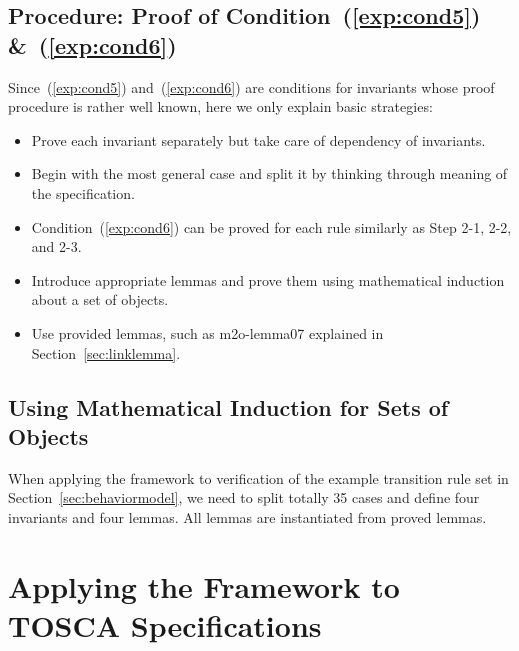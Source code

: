 \documentclass[12pt]{report}
\begin{document}
\section{Procedure: Proof of Condition~(\ref{exp:cond5}) \&~(\ref{exp:cond6})}
\label{sec:invariant}
Since~(\ref{exp:cond5}) and~(\ref{exp:cond6}) are conditions for invariants whose proof procedure
is rather well known, here we only explain basic strategies:
\begin{itemize}
\item Prove each invariant separately but take care of dependency
  of invariants.
\item Begin with the most general case and split it by thinking
  through meaning of the specification.
\item Condition~(\ref{exp:cond6}) can be proved for each rule similarly as Step
  2-1, 2-2, and 2-3.
\item Introduce appropriate lemmas and prove them using mathematical
  induction about a set of objects.
\item Use provided lemmas, such as m2o-lemma07 explained in
  Section~\ref{sec:linklemma}.
\end{itemize}

\section{Using Mathematical Induction for Sets of Objects}
\label{sec:induction}

When applying the framework to verification of the example transition rule
set in Section~\ref{sec:behaviormodel}, we need to split totally 35
cases and define four invariants and four lemmas.  All lemmas are
instantiated from proved lemmas.

\chapter{Applying the Framework to TOSCA Specifications}
\label{chap:appTOSCA}

\end{document}
